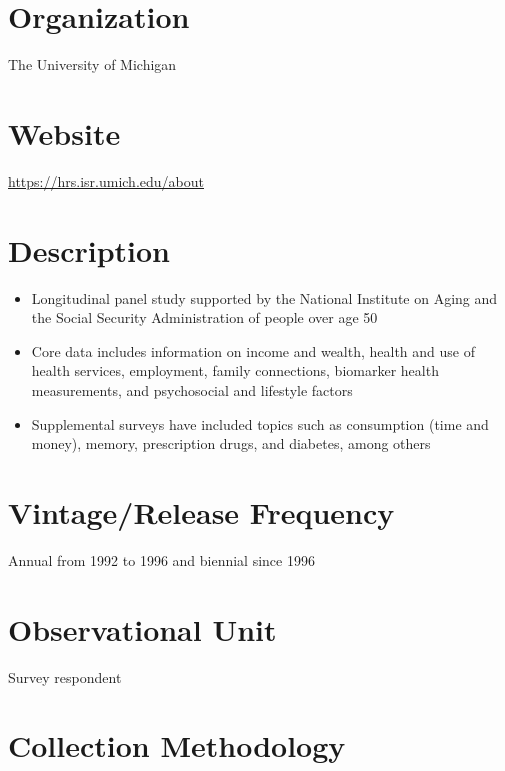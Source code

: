 \documentclass[
]{book}
\providecommand{\tightlist}{%
  \setlength{\itemsep}{0pt}\setlength{\parskip}{0pt}}
\begin{document}
\hypertarget{organization-30}{%
\section{Organization}\label{organization-30}}

The University of Michigan

\hypertarget{website-30}{%
\section{Website}\label{website-30}}

\url{https://hrs.isr.umich.edu/about}

\hypertarget{description-30}{%
\section{Description}\label{description-30}}

\begin{itemize}
\tightlist
\item
  Longitudinal panel study supported by the National Institute on Aging and the Social Security Administration of people over age 50
\item
  Core data includes information on income and wealth, health and use of health services, employment, family connections, biomarker health measurements, and psychosocial and lifestyle factors
\item
  Supplemental surveys have included topics such as consumption (time and money), memory, prescription drugs, and diabetes, among others
\end{itemize}

\hypertarget{vintagerelease-frequency-30}{%
\section{Vintage/Release Frequency}\label{vintagerelease-frequency-30}}

Annual from 1992 to 1996 and biennial since 1996

\hypertarget{observational-unit-30}{%
\section{Observational Unit}\label{observational-unit-30}}

Survey respondent

\hypertarget{collection-methodology-30}{%
\section{Collection Methodology}\label{collection-methodology-30}}
\end{document}
